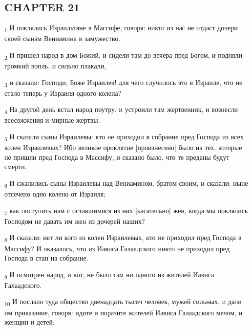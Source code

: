 \subsection{CHAPTER 21}
\begin{tcolorbox}
\textsubscript{1} И поклялись Израильтяне в Массифе, говоря: никто из нас не отдаст дочери своей сынам Вениамина в замужество.
\end{tcolorbox}
\begin{tcolorbox}
\textsubscript{2} И пришел народ в дом Божий, и сидели там до вечера пред Богом, и подняли громкий вопль, и сильно плакали,
\end{tcolorbox}
\begin{tcolorbox}
\textsubscript{3} и сказали: Господи, Боже Израилев! для чего случилось это в Израиле, что не стало теперь у Израиля одного колена?
\end{tcolorbox}
\begin{tcolorbox}
\textsubscript{4} На другой день встал народ поутру, и устроили там жертвенник, и вознесли всесожжения и мирные жертвы.
\end{tcolorbox}
\begin{tcolorbox}
\textsubscript{5} И сказали сыны Израилевы: кто не приходил в собрание пред Господа из всех колен Израилевых? Ибо великое проклятие [произнесено] было на тех, которые не пришли пред Господа в Массифу, и сказано было, что те преданы будут смерти.
\end{tcolorbox}
\begin{tcolorbox}
\textsubscript{6} И сжалились сыны Израилевы над Вениамином, братом своим, и сказали: ныне отсечено одно колено от Израиля;
\end{tcolorbox}
\begin{tcolorbox}
\textsubscript{7} как поступить нам с оставшимися из них [касательно] жен, когда мы поклялись Господом не давать им жен из дочерей наших?
\end{tcolorbox}
\begin{tcolorbox}
\textsubscript{8} И сказали: нет ли кого из колен Израилевых, кто не приходил пред Господа в Массифу? И оказалось, что из Иависа Галаадского никто не приходил пред Господа в стан на собрание.
\end{tcolorbox}
\begin{tcolorbox}
\textsubscript{9} И осмотрен народ, и вот, не было там ни одного из жителей Иависа Галаадского.
\end{tcolorbox}
\begin{tcolorbox}
\textsubscript{10} И послало туда общество двенадцать тысяч человек, мужей сильных, и дали им приказание, говоря: идите и поразите жителей Иависа Галаадского мечом, и женщин и детей;
\end{tcolorbox}
